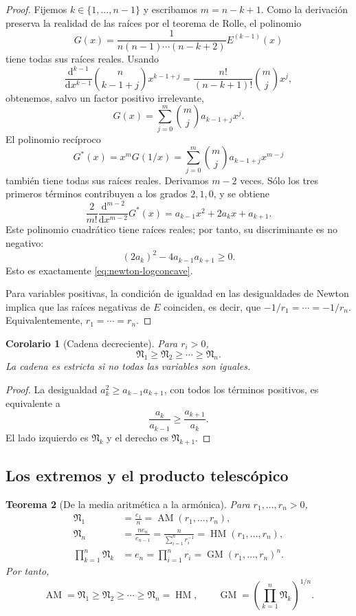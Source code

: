 \documentclass[11pt,oneside]{scrartcl}
\theoremstyle{plainblue}
\newtheorem{theorem}{Teorema}[section]
\newtheorem{corollary}[theorem]{Corolario}
\theoremstyle{definitionblue}
\theoremstyle{remarkgray}
\newcommand{\dd}{\mathrm{d}}
\newcommand{\AM}{\operatorname{AM}}
\newcommand{\GM}{\operatorname{GM}}
\newcommand{\HM}{\operatorname{HM}}
\newcommand{\cN}{\mathfrak{N}}
\begin{document}
\begin{proof}
Fijemos \(k\in\{1,\dots,n-1\}\) y escribamos \(m=n-k+1\). Como la derivación
preserva la realidad de las raíces por el teorema de Rolle, el polinomio
\[
G(x)=\frac{1}{n(n-1)\cdots(n-k+2)}E^{(k-1)}(x)
\]
tiene todas sus raíces reales. Usando
\[
\frac{\dd^{k-1}}{\dd x^{k-1}}\binom n{k-1+j}x^{k-1+j}
=\frac{n!}{(n-k+1)!}\binom mj x^j,
\]
obtenemos, salvo un factor positivo irrelevante,
\[
G(x)=\sum_{j=0}^{m}\binom mj a_{k-1+j}x^j.
\]
El polinomio recíproco
\[
G^*(x)=x^mG(1/x)
=\sum_{j=0}^{m}\binom mj a_{k-1+j}x^{m-j}
\]
también tiene todas sus raíces reales. Derivamos \(m-2\) veces. Sólo los tres
primeros términos contribuyen a los grados \(2,1,0\), y se obtiene
\[
\frac{2}{m!}\frac{\dd^{m-2}}{\dd x^{m-2}}G^*(x)
=a_{k-1}x^2+2a_kx+a_{k+1}.
\]
Este polinomio cuadrático tiene raíces reales; por tanto, su discriminante es no
negativo:
\[
(2a_k)^2-4a_{k-1}a_{k+1}\ge0.
\]
Esto es exactamente \cref{eq:newton-logconcave}.

Para variables positivas, la condición de igualdad en las desigualdades de Newton
implica que las raíces negativas de \(E\) coinciden, es decir, que
\(-1/r_1=\cdots=-1/r_n\). Equivalentemente, \(r_1=\cdots=r_n\).
\end{proof}

\begin{corollary}[Cadena decreciente]\label{cor:chain-monotone}
Para \(r_i>0\),
\begin{equation}\label{eq:chain}
\boxed{
\cN_1\ge\cN_2\ge\cdots\ge\cN_n}.
\end{equation}
La cadena es estricta si no todas las variables son iguales.
\end{corollary}

\begin{proof}
La desigualdad \(a_k^2\ge a_{k-1}a_{k+1}\), con todos los términos positivos, es
equivalente a
\[
\frac{a_k}{a_{k-1}}\ge\frac{a_{k+1}}{a_k}.
\]
El lado izquierdo es \(\cN_k\) y el derecho es \(\cN_{k+1}\).
\end{proof}

\subsection{Los extremos y el producto telescópico}

\begin{theorem}[De la media aritmética a la armónica]\label{thm:endpoints-product}
Para \(r_1,\dots,r_n>0\),
\begin{align}
\cN_1&=\frac{e_1}{n}=\AM(r_1,\dots,r_n),\label{eq:N1-AM}\\
\cN_n&=\frac{ne_n}{e_{n-1}}
=\frac{n}{\sum_{i=1}^{n}r_i^{-1}}
=\HM(r_1,\dots,r_n),\label{eq:Nn-HM}\\
\prod_{k=1}^{n}\cN_k&=e_n=\prod_{i=1}^{n}r_i=\GM(r_1,\dots,r_n)^n.\label{eq:product-GM}
\end{align}
Por tanto,
\begin{equation}\label{eq:main-chain-product}
\boxed{
\AM=\cN_1\ge\cN_2\ge\cdots\ge\cN_n=\HM,
\qquad
\GM=\left(\prod_{k=1}^{n}\cN_k\right)^{1/n}.}
\end{equation}
\end{theorem}
\end{document}
